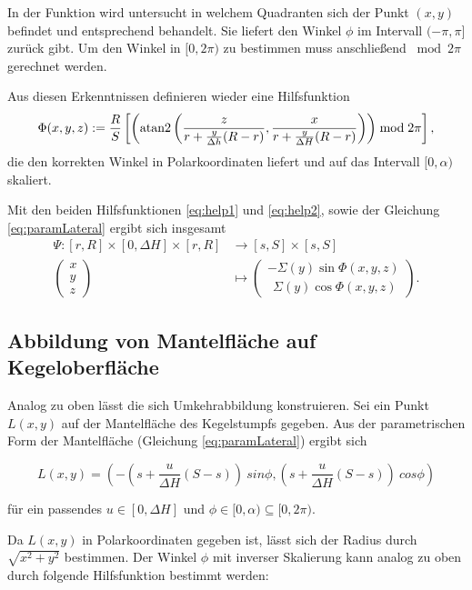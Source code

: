 In der Funktion wird untersucht in welchem Quadranten sich der Punkt $(x,y)$ befindet und entsprechend behandelt. Sie liefert den Winkel $\phi$ im Intervall $(-\pi, \pi]$ zurück gibt.
Um den Winkel in $[0,2\pi)$ zu bestimmen muss anschließend $\bmod 2\pi$ gerechnet werden.

Aus diesen Erkenntnissen definieren wieder eine Hilfsfunktion
\begin{equation} \label{eq:help2}
\Phi(x,y,z) := \frac{R}{S} \left[\left(\text{atan2}\left(\frac{z}{r + \frac{y}{\Delta h} (R - r)}, \frac{x}{r + \frac{y}{\Delta H} (R - r)}\right)\right) \bmod 2\pi \right],
\end{equation}
die den korrekten Winkel in Polarkoordinaten liefert und auf das Intervall $[0, \alpha)$ skaliert.

Mit den beiden Hilfsfunktionen \ref{eq:help1} und \ref{eq:help2}, sowie der Gleichung \ref{eq:paramLateral} ergibt sich insgesamt
\begin{equation}\label{eq:coneToLateral}
\begin{aligned}
\Psi \colon [r,R] \times [0, \Delta H] \times [r,R] &\to [s,S] \times [s,S]\\
\begin{pmatrix}
x \\ y \\ z
\end{pmatrix}  &\mapsto
\begin{pmatrix}
-\Sigma(y)\sin \Phi(x,y,z)\\
 ~~\Sigma(y)\cos\Phi(x,y,z)
\end{pmatrix}.
\end{aligned}
\end{equation}

\subsection{Abbildung von Mantelfläche auf Kegeloberfläche}

Analog zu oben lässt die sich Umkehrabbildung konstruieren.
Sei ein Punkt $L(x,y)$ auf der Mantelfläche des Kegelstumpfs gegeben. Aus der parametrischen Form der Mantelfläche (Gleichung \ref{eq:paramLateral}) ergibt sich

\[
L(x,y) = (-(s + \frac{u}{\Delta H}(S-s)) ~sin \phi, (s + \frac{u}{\Delta H} (S-s)) ~cos \phi)
\]

für ein passendes $u\in [0, \Delta H]$ und $\phi \in [0, \alpha) \subseteq  [0, 2\pi)$.

Da $L(x,y)$ in Polarkoordinaten gegeben ist, lässt sich der Radius durch $\sqrt{x^2+y^2}$ bestimmen. Der Winkel $\phi$ mit inverser Skalierung kann analog zu oben durch folgende Hilfsfunktion bestimmt werden:

